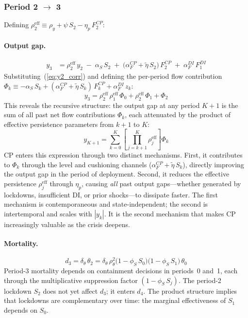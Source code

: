 \documentclass[12pt, a4paper]{article}
\begin{document}
\subsubsection*{Period 2 $\to$ 3}

Defining $\rho_2^{\mathrm{eff}} \equiv \rho_y + \psi\, S_2 -
\eta_p\, F_2^{CP}$:

\paragraph{Output gap.}
%
\begin{align}
    y_3 &= \rho_2^{\mathrm{eff}}\, y_2
          \;-\; \alpha_S\, S_2
          \;+\; \bigl(\alpha_F^{CP} + \tilde{\eta}\, S_2\bigr)\, F_2^{CP}
          \;+\; \alpha_F^{DI}\, F_1^{DI}
    \label{eq:y3_corr}
\end{align}
%
Substituting~(\ref{eq:y2_corr}) and defining the per-period flow contribution
$\Phi_k \equiv -\alpha_S\, S_k
+ (\alpha_F^{CP} + \tilde{\eta}\, S_k)\, F_k^{CP}
+ \alpha_F^{DI}\, z_k$:
%
\begin{equation}
    y_3 = \rho_2^{\mathrm{eff}}\, \rho_1^{\mathrm{eff}}\, \Phi_0
        + \rho_2^{\mathrm{eff}}\, \Phi_1
        + \Phi_2
    \label{eq:y3_compact_corr}
\end{equation}
%
This reveals the recursive structure: the output gap at any period $K+1$ is the
sum of all past net flow contributions $\Phi_k$, each attenuated by the product
of effective persistence parameters from $k+1$ to $K$:
%
\begin{equation}
    y_{K+1} = \sum_{k=0}^{K} \left[\prod_{j=k+1}^{K}
    \rho_j^{\mathrm{eff}}\right] \Phi_k
    \label{eq:y_recursive}
\end{equation}
%
CP enters this expression through two distinct mechanisms. First, it
contributes to $\Phi_k$ through the level and cushioning channels
($\alpha_F^{CP} + \tilde{\eta}\, S_k$), directly improving the output gap in
the period of deployment. Second, it reduces the effective persistence
$\rho_j^{\mathrm{eff}}$ through $\eta_p$, causing \textit{all} past output
gaps---whether generated by lockdowns, insufficient DI, or prior
shocks---to dissipate faster. The first mechanism is contemporaneous and
state-independent; the second is intertemporal and scales with $|y_k|$. It is
the second mechanism that makes CP increasingly valuable as the crisis deepens.

\paragraph{Mortality.}
%
\begin{equation}
    d_3 = \delta_\theta\, \theta_2
        = \delta_\theta\, \rho_\theta^2\bigl(1 - \phi_S\, S_0\bigr)
          \bigl(1 - \phi_S\, S_1\bigr)\, \theta_0
    \label{eq:d3_corr}
\end{equation}
%
Period-3 mortality depends on containment decisions in periods~0 and~1, each
through the multiplicative suppression factor $(1 - \phi_S\, S_j)$. The
period-2 lockdown $S_2$ does not yet affect $d_3$; it enters $d_4$. The product
structure implies that lockdowns are complementary over time: the marginal
effectiveness of $S_1$ depends on $S_0$.
\end{document}
